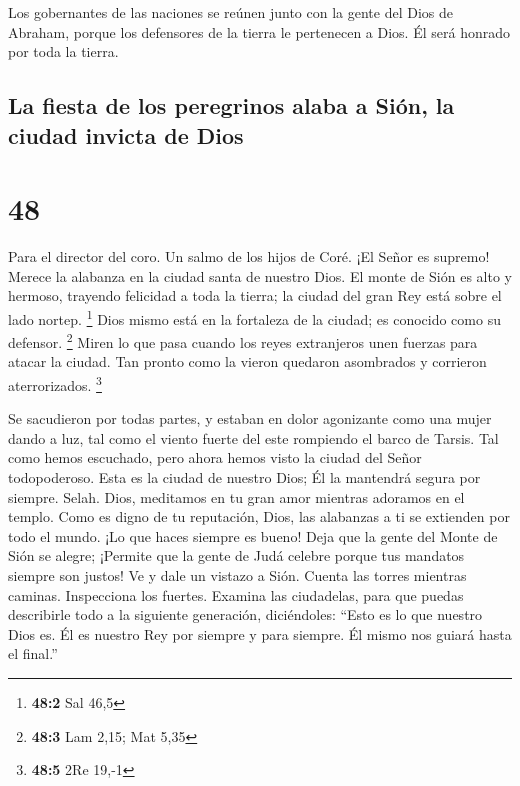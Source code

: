  Los gobernantes de las naciones se reúnen junto con la
gente del Dios de Abraham, porque los defensores de la tierra le
pertenecen a Dios. Él será honrado por toda la tierra.

\hypertarget{la-fiesta-de-los-peregrinos-alaba-a-siuxf3n-la-ciudad-invicta-de-dios}{%
\subsection{La fiesta de los peregrinos alaba a Sión, la ciudad invicta
de
Dios}\label{la-fiesta-de-los-peregrinos-alaba-a-siuxf3n-la-ciudad-invicta-de-dios}}

\hypertarget{section-47}{%
\section{48}\label{section-47}}

Para el director del coro. Un salmo de los hijos de Coré. 
¡El Señor es supremo! Merece la alabanza en la ciudad santa de nuestro
Dios.  El monte de Sión es alto y hermoso, trayendo
felicidad a toda la tierra; la ciudad del gran Rey está sobre el lado
nortep. \footnote{\textbf{48:2} Sal 46,5}  Dios mismo está
en la fortaleza de la ciudad; es conocido como su defensor. \footnote{\textbf{48:3}
  Lam 2,15; Mat 5,35}  Miren lo que pasa cuando los reyes
extranjeros unen fuerzas para atacar la ciudad.  Tan pronto
como la vieron quedaron asombrados y corrieron aterrorizados.
\footnote{\textbf{48:5} 2Re 19,-1}

 Se sacudieron por todas partes, y estaban en dolor
agonizante como una mujer dando a luz,  tal como el viento
fuerte del este rompiendo el barco de Tarsis.  Tal como
hemos escuchado, pero ahora hemos visto la ciudad del Señor
todopoderoso. Esta es la ciudad de nuestro Dios; Él la mantendrá segura
por siempre. Selah.  Dios, meditamos en tu gran amor
mientras adoramos en el templo.  Como es digno de tu
reputación, Dios, las alabanzas a ti se extienden por todo el mundo. ¡Lo
que haces siempre es bueno!  Deja que la gente del Monte de
Sión se alegre; ¡Permite que la gente de Judá celebre porque tus
mandatos siempre son justos!  Ve y dale un vistazo a Sión.
Cuenta las torres mientras caminas.  Inspecciona los
fuertes. Examina las ciudadelas, para que puedas describirle todo a la
siguiente generación, diciéndoles:  ``Esto es lo que
nuestro Dios es. Él es nuestro Rey por siempre y para siempre. Él mismo
nos guiará hasta el final.''

